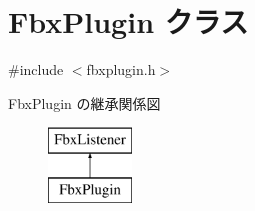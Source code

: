 \hypertarget{class_fbx_plugin}{}\section{Fbx\+Plugin クラス}
\label{class_fbx_plugin}


{\ttfamily \#include $<$fbxplugin.\+h$>$}

Fbx\+Plugin の継承関係図\begin{figure}[H]
\begin{center}
\leavevmode
\includegraphics[height=2.000000cm]{class_fbx_plugin}
\end{center}
\end{figure}
